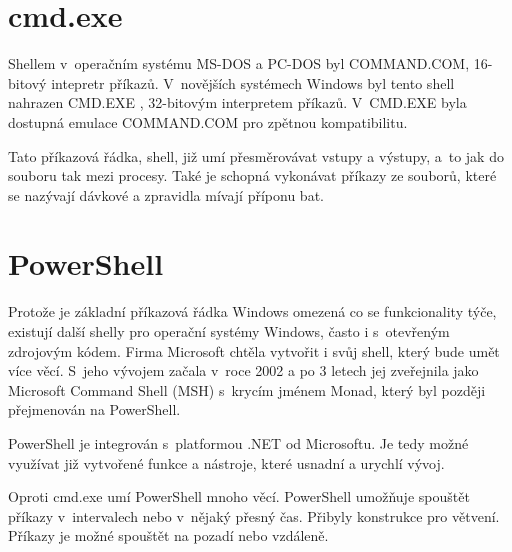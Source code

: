 \documentclass[thesis=M,czech]{FITthesis}[2012/06/26]
\begin{document}



\section{cmd.exe}

Shellem v~operačním systému MS-DOS a PC-DOS byl COMMAND.COM, 16-bitový intepretr příkazů. V~novějších systémech Windows byl tento shell nahrazen CMD.EXE \cite{windowsshell}, 32-bitovým interpretem příkazů. V~CMD.EXE byla dostupná emulace COMMAND.COM pro zpětnou kompatibilitu.

Tato příkazová řádka, shell, již umí přesměrovávat vstupy a výstupy, a~to jak do souboru tak mezi procesy. Také je schopná vykonávat příkazy ze souborů, které se nazývají dávkové a zpravidla mívají příponu bat.



\section{PowerShell}

Protože je základní příkazová řádka Windows omezená co se funkcionality týče, existují další shelly pro operační systémy Windows, často i s~otevřeným zdrojovým kódem. Firma Microsoft chtěla vytvořit i svůj shell, který bude umět více věcí. S~jeho vývojem začala v~roce 2002 a po 3 letech jej zveřejnila jako Microsoft Command Shell (MSH) s~krycím jménem Monad, který byl později přejmenován na PowerShell.

PowerShell je integrován s~platformou .NET \cite{windowsdotnet} od Microsoftu. Je tedy možné využívat již vytvořené funkce a nástroje, které usnadní a urychlí vývoj.

Oproti cmd.exe umí PowerShell mnoho věcí. PowerShell umožňuje spouštět příkazy v~intervalech nebo v~nějaký přesný čas. Přibyly konstrukce pro větvení. Příkazy je možné spouštět na pozadí nebo vzdáleně.


\end{document}
